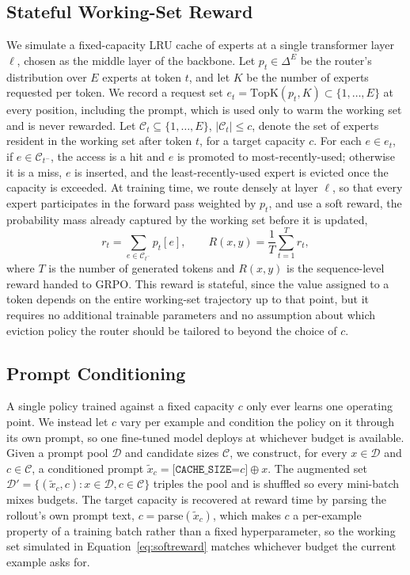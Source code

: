 \documentclass{article}
\begin{document}
\subsection{Stateful Working-Set Reward}
\label{sec:reward}

We simulate a fixed-capacity LRU cache of experts at a single transformer layer
$\ell$, chosen as the middle layer of the backbone. Let $p_t \in \Delta^{E}$ be the
router's distribution over $E$ experts at token $t$, and let $K$ be the number of
experts requested per token. We record a request set
$e_t = \mathrm{TopK}(p_t, K) \subset \{1, \dots, E\}$ at every position, including the
prompt, which is used only to warm the working set and is never rewarded. Let
$\mathcal{C}_t \subseteq \{1, \dots, E\}$, $|\mathcal{C}_t| \le c$, denote the set of
experts resident in the working set after token $t$, for a target capacity $c$. For each
$e \in e_t$, if $e \in \mathcal{C}_{t^-}$, the access is a hit and $e$ is promoted to
most-recently-used; otherwise it is a miss, $e$ is inserted, and the least-recently-used
expert is evicted once the capacity is exceeded. At training time, we route densely at
layer $\ell$, so that every expert participates in the forward pass weighted by $p_t$,
and use a soft reward, the probability mass already captured by the working set before it is
updated,
\begin{equation}
  r_t = \sum_{e \in \mathcal{C}_{t^-}} p_t[e], \qquad
  R(x, y) = \frac{1}{T} \sum_{t=1}^{T} r_t,
  \label{eq:softreward}
\end{equation}
where $T$ is the number of generated tokens and $R(x, y)$ is the sequence-level reward
handed to GRPO. This reward is stateful, since the value assigned to a token depends on
the entire working-set trajectory up to that point, but it requires no additional trainable
parameters and no assumption about which eviction policy the router should be tailored
to beyond the choice of $c$.

\subsection{Prompt Conditioning}
\label{sec:conditioning}

A single policy trained against a fixed capacity $c$ only ever learns one operating
point. We instead let $c$ vary per example and condition the policy on it through its own
prompt, so one fine-tuned model deploys at whichever budget is available. Given a prompt
pool $\mathcal{D}$ and candidate sizes $\mathcal{C}$, we construct, for every
$x \in \mathcal{D}$ and $c \in \mathcal{C}$, a conditioned prompt
$\tilde{x}_c = \texttt{[CACHE\_SIZE=}c\texttt{]} \oplus x$. The augmented set
$\mathcal{D}' = \{(\tilde{x}_c, c) : x \in \mathcal{D}, c \in \mathcal{C}\}$ triples the
pool and is shuffled so every mini-batch mixes budgets. The target capacity is recovered
at reward time by parsing the rollout's own prompt text, $c = \mathrm{parse}(\tilde{x}_c)$,
which makes $c$ a per-example
property of a training batch rather than a fixed hyperparameter, so the working set simulated
in Equation~\ref{eq:softreward} matches whichever budget the current example asks for.
\end{document}
